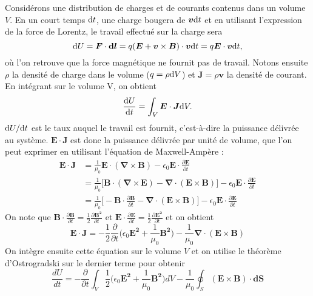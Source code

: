 Considérons une distribution de charges et de courants contenus dans un volume $V$. En un court temps $\mathrm{d} t$, une charge bougera de $\bm{v}\mathrm{d} t$ et en utilisant l'expression de la force de Lorentz, le travail effectué sur la charge sera
\begin{equation*}
\mathrm{d} U = \bm{F}\cdot\bm{\mathrm{d} l} = q(\bm{E}+\bm{v}\times\bm{B})\cdot\bm{v}\mathrm{d} t = q\bm{E}\cdot \bm{v} \mathrm{d} t,
\end{equation*}
où l'on retrouve que la force magnétique ne fournit pas de travail. Notons ensuite $\rho$ la densité de charge dans le volume ($q = \rho \mathrm{d} V$) et $\bm{J} =\rho \bm{v}$ la densité de courant. En intégrant sur le volume V, on obtient
\begin{equation*}
\frac{\mathrm{d} U}{\mathrm{d} t} = \int_V \bm{E} \cdot \bm{J} \mathrm{d} V.
\end{equation*}
$\mathrm{d} U/\mathrm{d} t$ est le taux auquel le travail est fournit, c'est-à-dire la puissance délivrée au système. $\bm{E} \cdot \bm{J}$ est donc la puissance délivrée par unité de volume, que l'on peut exprimer en utilisant l'équation de Maxwell-Ampère :
\begin{align*}
\bm{E} \cdot \bm{J} &= \frac{1}{\mu_0}\bm{E} \cdot (\bm{\nabla} \times \bm{B})-\epsilon_0\bm{E}\cdot\frac{\partial\bm{E}}{\partial t}\\
&= \frac{1}{\mu_0}\bigl[\bm{B} \cdot (\bm{\nabla} \times \bm{E})-\bm{\nabla} \cdot (\bm{E} \times \bm{B})\bigr]-\epsilon_0\bm{E}\cdot\frac{\partial\bm{E}}{\partial t}\\
&= \frac{1}{\mu_0}\bigl[-\bm{B} \cdot \frac{\partial\bm{B}}{\partial t}-\bm{\nabla} \cdot (\bm{E} \times \bm{B})\bigr]-\epsilon_0\bm{E}\cdot\frac{\partial\bm{E}}{\partial t}
\end{align*}
On note que $\bm{B} \cdot \frac{\partial\bm{B}}{\partial t} = \frac{1}{2}\frac{\partial\bm{B^2}}{\partial t}$ et $\bm{E} \cdot \frac{\partial\bm{E}}{\partial t} = \frac{1}{2}\frac{\partial\bm{E^2}}{\partial t}$ et on obtient
\begin{equation*}
\bm{E} \cdot \bm{J} = -\frac{1}{2}\frac{\partial}{\partial t}\biggl(\epsilon_0\bm{E^2}+\frac{1}{\mu_0}\bm{B^2}\biggl)-\frac{1}{\mu_0}\bm{\nabla} \cdot (\bm{E} \times \bm{B})
\end{equation*}
On intègre ensuite cette équation sur le volume $V$ et on utilise le théorème d'Ostrogradski sur le dernier terme pour obtenir
\begin{equation*}
\frac{dU}{dt} = -\frac{\partial}{\partial t}\int_V\frac{1}{2}\biggl(\epsilon_0\bm{E^2}+\frac{1}{\mu_0}\bm{B^2}\biggl)dV-\frac{1}{\mu_0} \oint_S(\bm{E} \times \bm{B})\cdot\bm{dS}
\end{equation*}
